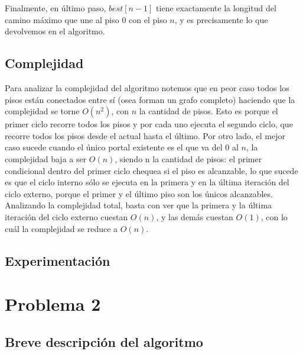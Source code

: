 \documentclass{article}
\theoremstyle{definition}
\theoremstyle{remark}
\begin{document}
Finalmente, en último paso, $best[n-1]$ tiene exactamente la longitud del camino máximo que une al piso 0 con el piso $n$, y es precisamente lo que devolvemos en el algoritmo.

\subsection{Complejidad}


Para analizar la complejidad del algoritmo notemos que en peor caso todos los pisos están conectados entre sí (osea forman un grafo completo) haciendo que la complejidad se torne $O(n^2)$, con $n$ la cantidad de pisos. Esto es porque el primer ciclo recorre todos los pisos y por cada uno ejecuta el segundo ciclo, que recorre todos los pisos desde el actual hasta el último. Por otro lado, el mejor caso sucede cuando el único portal existente es el que va del 0 al $n$, la complejidad baja a ser $O(n)$, siendo n la cantidad de pisos: el primer condicional dentro del primer ciclo chequea si el piso es alcanzable, lo que sucede es que el ciclo interno sólo se ejecuta en la primera y en la última iteración del ciclo externo, porque el primer y el último piso son los únicos alcanzables. Analizando la complejidad total, basta con ver que la primera y la última iteración del ciclo externo cuestan $O(n)$, y las demás cuestan $O(1)$, con lo cuál la complejidad se reduce a $O(n)$.

\subsection{Experimentación}

\section{Problema 2}

\subsection{Breve descripción del algoritmo}
\end{document}
